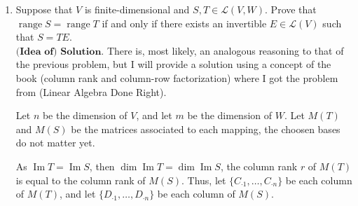 \documentclass{article}
\theoremstyle{remark}
\begin{document}
\begin{enumerate}
        \begin{center}
            $C_j = M(E)_{\cdot 1}M(T)_{1j} + \dots + M(E)_{\cdot m}M(T)_{mj} = O_{\cdot j}$
        \end{center}
        Where each column of $M(E)$ is linearly independent (since its rank its $m$). Thus, the entries of the $j$th column of $M(T)$ must be zero,
        thus, the column itself its zero.
        \begin{flushright}
            \qed
        \end{flushright}
        \item Suppose that $V$ is finite-dimensional and $S, T \in \mathcal{L}(V, W)$. Prove that $\operatorname{range} S = \operatorname{range} T$ if and only if there exists an invertible $E \in \mathcal{L}(V)$ such that $S = TE$.\\
        $\textbf{(Idea of) Solution.}$ There is, most likely, an analogous reasoning to that of the previous problem, but I will provide a solution using a concept of the book (column rank and column-row factorization) where I got the problem from (Linear Algebra Done Right).

        Let $n$ be the dimension of $V$, and let $m$ be the dimension of $W$. 
        Let $M(T)$ and $M(S)$ be the matrices associated to each mapping, the choosen bases do not matter yet.

        As $\operatorname{Im }T = \operatorname{Im }S$, then $\dim \operatorname{Im }T = \dim \operatorname{Im }S$, the column rank $r$ of $M(T)$ is equal to the column rank of $M(S)$.
        Thus, let $\{C_{\cdot 1}, \dots, C_{\cdot n}\}$ be each column of $M(T)$, and let $\{D_{\cdot 1},\dots, D_{\cdot n}\}$ be each column of $M(S)$.


\end{enumerate}
\end{document}
